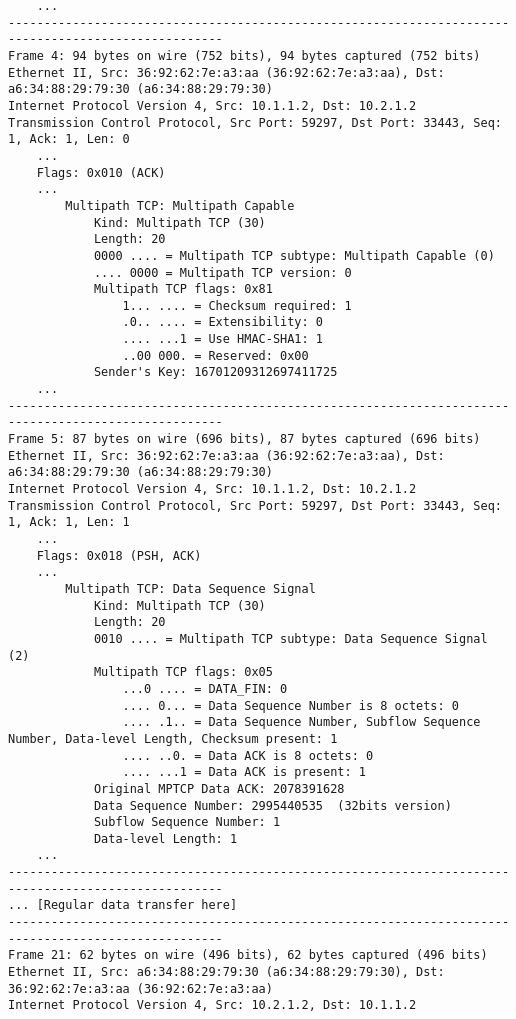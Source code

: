 \begin{verbatim}
    ...
----------------------------------------------------------------------------------------------------
Frame 4: 94 bytes on wire (752 bits), 94 bytes captured (752 bits)
Ethernet II, Src: 36:92:62:7e:a3:aa (36:92:62:7e:a3:aa), Dst: a6:34:88:29:79:30 (a6:34:88:29:79:30)
Internet Protocol Version 4, Src: 10.1.1.2, Dst: 10.2.1.2
Transmission Control Protocol, Src Port: 59297, Dst Port: 33443, Seq: 1, Ack: 1, Len: 0
    ...
    Flags: 0x010 (ACK)
    ...
        Multipath TCP: Multipath Capable
            Kind: Multipath TCP (30)
            Length: 20
            0000 .... = Multipath TCP subtype: Multipath Capable (0)
            .... 0000 = Multipath TCP version: 0
            Multipath TCP flags: 0x81
                1... .... = Checksum required: 1
                .0.. .... = Extensibility: 0
                .... ...1 = Use HMAC-SHA1: 1
                ..00 000. = Reserved: 0x00
            Sender's Key: 16701209312697411725
    ...
----------------------------------------------------------------------------------------------------
Frame 5: 87 bytes on wire (696 bits), 87 bytes captured (696 bits)
Ethernet II, Src: 36:92:62:7e:a3:aa (36:92:62:7e:a3:aa), Dst: a6:34:88:29:79:30 (a6:34:88:29:79:30)
Internet Protocol Version 4, Src: 10.1.1.2, Dst: 10.2.1.2
Transmission Control Protocol, Src Port: 59297, Dst Port: 33443, Seq: 1, Ack: 1, Len: 1
    ...
    Flags: 0x018 (PSH, ACK)
    ...
        Multipath TCP: Data Sequence Signal
            Kind: Multipath TCP (30)
            Length: 20
            0010 .... = Multipath TCP subtype: Data Sequence Signal (2)
            Multipath TCP flags: 0x05
                ...0 .... = DATA_FIN: 0
                .... 0... = Data Sequence Number is 8 octets: 0
                .... .1.. = Data Sequence Number, Subflow Sequence Number, Data-level Length, Checksum present: 1
                .... ..0. = Data ACK is 8 octets: 0
                .... ...1 = Data ACK is present: 1
            Original MPTCP Data ACK: 2078391628
            Data Sequence Number: 2995440535  (32bits version)
            Subflow Sequence Number: 1
            Data-level Length: 1
    ...
----------------------------------------------------------------------------------------------------
... [Regular data transfer here]
----------------------------------------------------------------------------------------------------
Frame 21: 62 bytes on wire (496 bits), 62 bytes captured (496 bits)
Ethernet II, Src: a6:34:88:29:79:30 (a6:34:88:29:79:30), Dst: 36:92:62:7e:a3:aa (36:92:62:7e:a3:aa)
Internet Protocol Version 4, Src: 10.2.1.2, Dst: 10.1.1.2

\end{verbatim}
